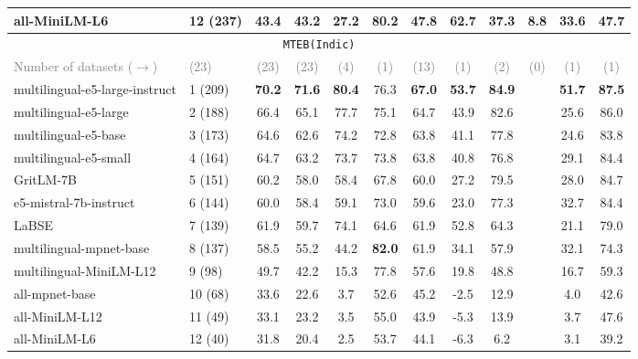 \begin{table*}[!th]
{{\begin{tabular}{llcc|cccccccc}
all-MiniLM-L6 & 12 (237) & 43.4 & 43.2 & 27.2 & 80.2 & 47.8 & 62.7 & 37.3 & 8.8 & 33.6 & 47.7 \\
\midrule
\multicolumn{12}{c}{\vspace{2mm} \normalsize \texttt{MTEB(Indic)}} \\
\textcolor{gray}{Number of datasets ($\rightarrow$) } & \textcolor{gray}{(23)} & \textcolor{gray}{(23)} & \multicolumn{1}{c}{\textcolor{gray}{(23)}} &   \multicolumn{1}{c}{\textcolor{gray}{(4)}} &   \textcolor{gray}{(1)}  &   \textcolor{gray}{(13)}   &   \textcolor{gray}{(1)}  &   \textcolor{gray}{(2)} &   \textcolor{gray}{(0)}  &   \textcolor{gray}{(1)} &   \textcolor{gray}{(1)}  \\
\midrule
multilingual-e5-large-instruct & 1 (209) & \textbf{70.2} & \textbf{71.6} & \textbf{80.4} & 76.3 & \textbf{67.0} & \textbf{53.7} & \textbf{84.9} & & \textbf{51.7} & \textbf{87.5} \\
multilingual-e5-large & 2 (188) & 66.4 & 65.1 & 77.7 & 75.1 & 64.7 & 43.9 & 82.6 & & 25.6 & 86.0 \\
multilingual-e5-base & 3 (173) & 64.6 & 62.6 & 74.2 & 72.8 & 63.8 & 41.1 & 77.8 & & 24.6 & 83.8 \\
multilingual-e5-small & 4 (164) & 64.7 & 63.2 & 73.7 & 73.8 & 63.8 & 40.8 & 76.8 & & 29.1 & 84.4 \\
GritLM-7B & 5 (151) & 60.2 & 58.0 & 58.4 & 67.8 & 60.0 & 27.2 & 79.5 & & 28.0 & 84.7 \\
e5-mistral-7b-instruct & 6 (144) & 60.0 & 58.4 & 59.1 & 73.0 & 59.6 & 23.0 & 77.3 & & 32.7 & 84.4 \\
LaBSE & 7 (139) & 61.9 & 59.7 & 74.1 & 64.6 & 61.9 & 52.8 & 64.3 & & 21.1 & 79.0 \\
multilingual-mpnet-base & 8 (137) & 58.5 & 55.2 & 44.2 & \textbf{82.0} & 61.9 & 34.1 & 57.9 & & 32.1 & 74.3 \\
multilingual-MiniLM-L12 & 9 (98) & 49.7 & 42.2 & 15.3 & 77.8 & 57.6 & 19.8 & 48.8 & & 16.7 & 59.3 \\
all-mpnet-base & 10 (68) & 33.6 & 22.6 & 3.7 & 52.6 & 45.2 & -2.5 & 12.9 & & 4.0 & 42.6 \\
all-MiniLM-L12 & 11 (49) & 33.1 & 23.2 & 3.5 & 55.0 & 43.9 & -5.3 & 13.9 & & 3.7 & 47.6 \\
all-MiniLM-L6 & 12 (40) & 31.8 & 20.4 & 2.5 & 53.7 & 44.1 & -6.3 & 6.2 & & 3.1 & 39.2 \\
\bottomrule


\end{tabular}}}
\end{table*}
